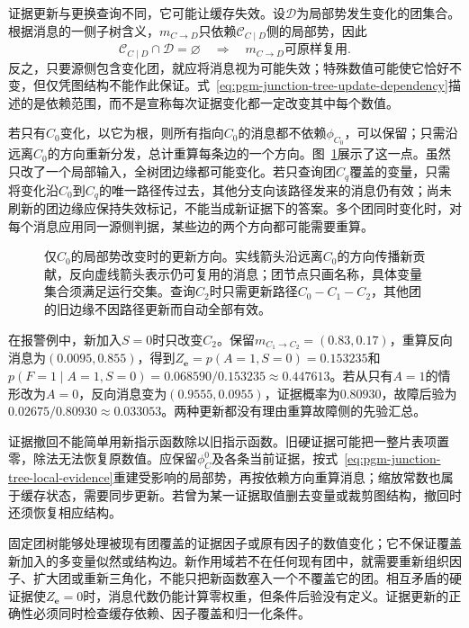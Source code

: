 证据更新与更换查询不同，它可能让缓存失效。设$\mathcal{D}$为局部势发生变化的团集合。根据消息的一侧子树含义，$m_{C\to D}$只依赖$\mathcal{C}_{C\mid D}$侧的局部势，因此
\begin{equation}
  \mathcal{C}_{C\mid D}\cap\mathcal{D}=\varnothing
  \quad\Longrightarrow\quad
  m_{C\to D}\text{可原样复用}.
  \label{eq:pgm-junction-tree-update-dependency}
\end{equation}
反之，只要源侧包含变化团，就应将消息视为可能失效；特殊数值可能使它恰好不变，但仅凭图结构不能作此保证。式~\eqref{eq:pgm-junction-tree-update-dependency}描述的是依赖范围，而不是宣称每次证据变化都一定改变其中每个数值。

若只有$C_0$变化，以它为根，则所有指向$C_0$的消息都不依赖$\phi_{C_0}$，可以保留；只需沿远离$C_0$的方向重新分发，总计重算每条边的一个方向。图~\ref{fig:pgm-junction-tree-evidence-update}展示了这一点。虽然只改了一个局部输入，全树团边缘都可能变化。若只查询团$C_q$覆盖的变量，只需将变化沿$C_0$到$C_q$的唯一路径传过去，其他分支向该路径发来的消息仍有效；尚未刷新的团边缘应保持失效标记，不能当成新证据下的答案。多个团同时变化时，对每个消息应用同一源侧判据，某些边的两个方向都可能需要重算。

\begin{figure}[htbp]
  \centering
  
  \caption{仅$C_0$的局部势改变时的更新方向。实线箭头沿远离$C_0$的方向传播新贡献，反向虚线箭头表示仍可复用的消息；团节点只画名称，具体变量集合须满足运行交集。查询$C_2$时只需更新路径$C_0-C_1-C_2$，其他团的旧边缘不因路径更新而自动全部有效。}
  \label{fig:pgm-junction-tree-evidence-update}
\end{figure}

在报警例中，新加入$S=0$时只改变$C_2$。保留$m_{C_1\to C_2}=(0.83,0.17)$，重算反向消息为$(0.0095,0.855)$，得到$Z_{\bm{e}}=p(A=1,S=0)=0.153235$和$p(F=1\mid A=1,S=0)=0.068590/0.153235\approx0.447613$。若从只有$A=1$的情形改为$A=0$，反向消息变为$(0.9555,0.0955)$，证据概率为$0.80930$，故障后验为$0.02675/0.80930\approx0.033053$。两种更新都没有理由重算故障侧的先验汇总。

证据撤回不能简单用新指示函数除以旧指示函数。旧硬证据可能把一整片表项置零，除法无法恢复原数值。应保留$\phi_C^0$及各条当前证据，按式~\eqref{eq:pgm-junction-tree-local-evidence}重建受影响的局部势，再按依赖方向重算消息；缩放常数也属于缓存状态，需要同步更新。若曾为某一证据取值删去变量或裁剪图结构，撤回时还须恢复相应结构。

固定团树能够处理被现有团覆盖的证据因子或原有因子的数值变化；它不保证覆盖新加入的多变量似然或结构边。新作用域若不在任何现有团中，就需要重新组织因子、扩大团或重新三角化，不能只把新函数塞入一个不覆盖它的团。相互矛盾的硬证据使$Z_{\bm{e}}=0$时，消息代数仍能计算零权重，但条件后验没有定义。证据更新的正确性必须同时检查缓存依赖、因子覆盖和归一化条件。

